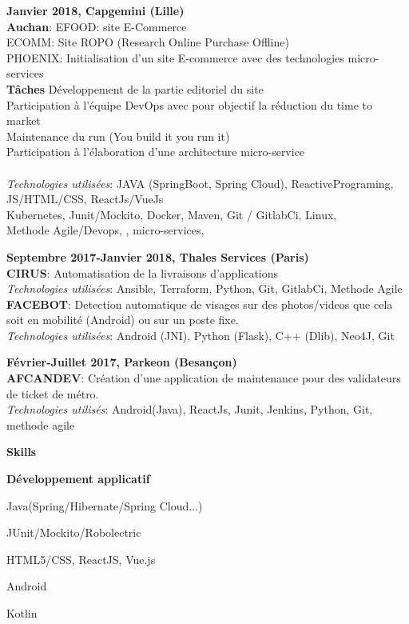 \documentclass[a4paper,11pt,final]{memoir}
\newcommand\tab[1][1,8cm]{\hspace*{#1}}
\newcommand{\CVSection}[1]
	{\Large\textbf{#1}\par
	\normalsize\normalfont}
\newcommand{\CVItem}[1]
	{\textbf{\color{RoyalBlue} #1}}
\begin{document}
\CVItem{Janvier 2018, Capgemini (Lille) }\\
\textbf{Auchan}: EFOOD: site E-Commerce\\
\tab ECOMM: Site ROPO (Research Online Purchase Offline)\\
\tab PHOENIX:  Initialisation d'un site E-commerce avec des technologies micro-services\\
\textbf{Tâches  }   \textbullet  Développement de la partie editoriel du site \\
\tab \textbullet  Participation à l'équipe DevOps avec pour objectif la réduction du time to market \\
\tab \textbullet Maintenance du run (You build it you run it) \\
\tab \textbullet Participation à l'élaboration d'une architecture micro-service  \\
\\
 \textit{Technologies utilisées}: JAVA (SpringBoot, Spring Cloud), ReactivePrograming, JS/HTML/CSS, ReactJs/VueJs  \\
Kubernetes, Junit/Mockito, Docker, Maven, Git / GitlabCi, Linux, \\
Methode Agile/Devops, , micro-services, 


\CVItem{Septembre 2017-Janvier 2018, Thales Services (Paris) }\\
\textbf{CIRUS}: Automatisation de la livraisons d'applications\\
 \textit{Technologies utilisées}: Ansible, Terraform, Python, Git, GitlabCi, Methode Agile \\
 \textbf{FACEBOT}: Detection automatique de visages sur des photos/videos que cela soit en mobilité (Android) ou sur un poste fixe.\\
 \textit{Technologies utilisées}: Android (JNI), Python (Flask), C++ (Dlib), Neo4J, Git 


\CVItem{Février-Juillet 2017, Parkeon (Besançon)}\\
\textbf{AFCANDEV}: Création d’une application de maintenance pour des validateurs de ticket de métro. \\
 \textit{Technologies utilisés}: Android(Java), ReactJs, Junit, Jenkins, Python, Git, methode agile


\CVSection{Skills}
\CVItem{Développement applicatif}
\begin{multicols}{2}
\begin{compactitem}[\color{RoyalBlue}$\circ$]
	\item Java(Spring/Hibernate/Spring Cloud...)
	\item JUnit/Mockito/Robolectric
	\item HTML5/CSS, ReactJS, Vue.js
	\item Android
	\item Kotlin 
\end{compactitem}
\end{multicols}
\end{document}
